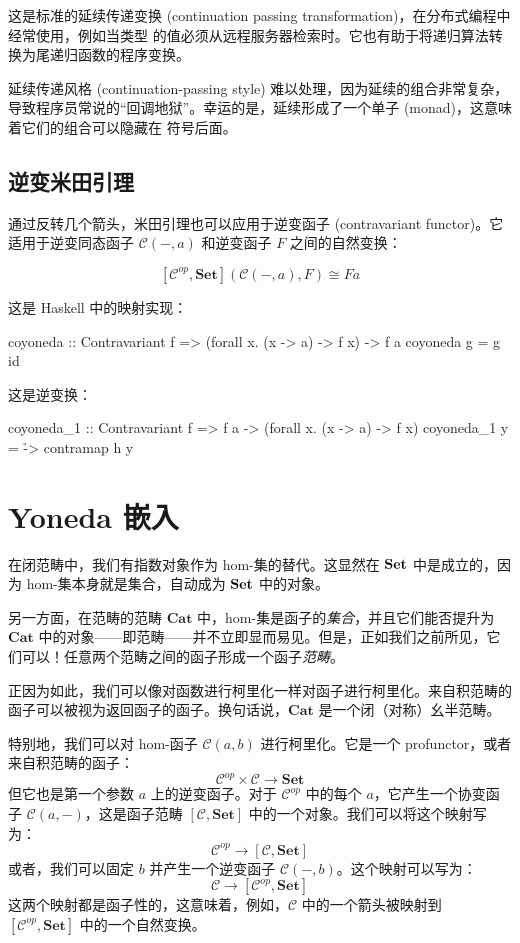 \documentclass[DaoFP]{subfiles}
\begin{document}
这是标准的延续传递变换 (continuation passing transformation)，在分布式编程中经常使用，例如当类型  的值必须从远程服务器检索时。它也有助于将递归算法转换为尾递归函数的程序变换。

延续传递风格 (continuation-passing style) 难以处理，因为延续的组合非常复杂，导致程序员常说的“回调地狱”。幸运的是，延续形成了一个单子 (monad)，这意味着它们的组合可以隐藏在  符号后面。

\subsection{逆变米田引理}

通过反转几个箭头，米田引理也可以应用于逆变函子 (contravariant functor)。它适用于逆变同态函子 $\mathcal{C}(-, a)$ 和逆变函子 $F$ 之间的自然变换：

\[ [\mathcal{C}^{op}, \mathbf{Set}]( \mathcal{C}(-, a), F) \cong F a \]

这是 Haskell 中的映射实现：
\begin{haskell}
coyoneda :: Contravariant f => (forall x. (x -> a) -> f x) -> f a
coyoneda g = g id
\end{haskell}
这是逆变换：
\begin{haskell}
coyoneda_1 :: Contravariant f => f a -> (forall x. (x -> a) -> f x)
coyoneda_1 y = \h -> contramap h y
\end{haskell}

\section{Yoneda 嵌入}

在闭范畴中，我们有指数对象作为 hom-集的替代。这显然在 $\mathbf{Set}$ 中是成立的，因为 hom-集本身就是集合，自动成为 $\mathbf{Set}$ 中的对象。

另一方面，在范畴的范畴 $\mathbf{Cat}$ 中，hom-集是函子的\emph{集合}，并且它们能否提升为 $\mathbf{Cat}$ 中的对象——即范畴——并不立即显而易见。但是，正如我们之前所见，它们可以！任意两个范畴之间的函子形成一个函子\emph{范畴}。

正因为如此，我们可以像对函数进行柯里化一样对函子进行柯里化。来自积范畴的函子可以被视为返回函子的函子。换句话说，$\mathbf{Cat}$ 是一个闭（对称）幺半范畴。

特别地，我们可以对 hom-函子 $\mathcal{C}(a, b)$ 进行柯里化。它是一个 profunctor，或者来自积范畴的函子：
\[ \mathcal{C}^{op} \times \mathcal{C} \to  \mathbf{Set} \]
但它也是第一个参数 $a$ 上的逆变函子。对于 $\mathcal{C}^{op}$ 中的每个 $a$，它产生一个协变函子 $\mathcal{C}(a, -)$，这是函子范畴 $ [\mathcal{C},  \mathbf{Set}] $ 中的一个对象。我们可以将这个映射写为：
\[ \mathcal{C}^{op} \to [\mathcal{C},  \mathbf{Set}] \]
或者，我们可以固定 $b$ 并产生一个逆变函子 $\mathcal{C}(-, b)$。这个映射可以写为：
\[ \mathcal{C} \to [\mathcal{C}^{op},  \mathbf{Set}] \]
这两个映射都是函子性的，这意味着，例如，$\mathcal{C}$ 中的一个箭头被映射到 $[\mathcal{C}^{op},  \mathbf{Set}]$ 中的一个自然变换。
\end{document}
